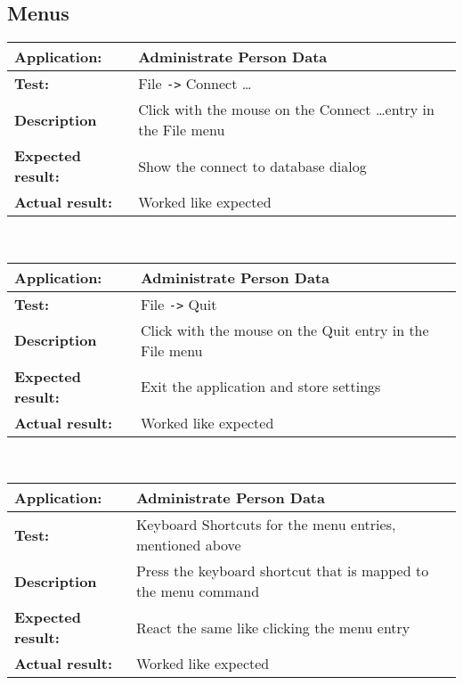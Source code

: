   \subsection{Menus}
   \begin{tabular}{|p{3.5cm}|p{10.5cm}|}
    \hline
     \textbf{Application:}	& Administrate Person Data\\
    \hline
     \textbf{Test:}		& File \verb=->= Connect \dots\\
    \hline
     \textbf{Description}	& Click with the mouse on the Connect \dots entry in the File menu\\
    \hline
     \textbf{Expected result:}	& Show the connect to database dialog\\
    \hline
     \textbf{Actual result:}	& Worked like expected\\
    \hline
   \end{tabular}\\
   \begin{tabular}{|p{3.5cm}|p{10.5cm}|}
    \hline
     \textbf{Application:}	& Administrate Person Data\\
    \hline
     \textbf{Test:}		& File \verb=->= Quit\\
    \hline
     \textbf{Description}	& Click with the mouse on the Quit entry in the File menu\\
    \hline
     \textbf{Expected result:}	& Exit the application and store settings\\
    \hline
     \textbf{Actual result:}	& Worked like expected\\
    \hline
   \end{tabular}\\
   \begin{tabular}{|p{3.5cm}|p{10.5cm}|}
    \hline
     \textbf{Application:}	& Administrate Person Data\\
    \hline
     \textbf{Test:}		& Keyboard Shortcuts for the menu entries, mentioned above\\
    \hline
     \textbf{Description}	& Press the keyboard shortcut that is mapped to the menu command\\
    \hline
     \textbf{Expected result:}	& React the same like clicking the menu entry\\
    \hline
     \textbf{Actual result:}	& Worked like expected\\
    \hline
   \end{tabular}

